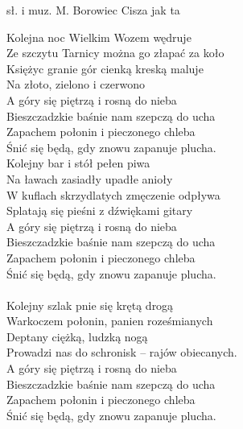 {sł. i muz. M. Borowiec}
{Cisza jak ta}
\begin{text}
Kolejna noc Wielkim Wozem wędruje\\
Ze szczytu Tarnicy można go złapać za koło\\
Księżyc granie gór cienką kreską maluje\\
Na złoto, zielono i czerwono\\

\vin A góry się piętrzą i rosną do nieba\\
\vin Bieszczadzkie baśnie nam szepczą do ucha\\
\vin Zapachem połonin i pieczonego chleba\\
\vin Śnić się będą, gdy znowu zapanuje plucha.\\

Kolejny bar i stół pełen piwa\\
Na ławach zasiadły upadłe anioły\\
W kuflach skrzydlatych zmęczenie odpływa\\
Splatają się pieśni z dźwiękami gitary\\

\vin A góry się piętrzą i rosną do nieba\\
\vin Bieszczadzkie baśnie nam szepczą do ucha\\
\vin Zapachem połonin i pieczonego chleba\\
\vin Śnić się będą, gdy znowu zapanuje plucha.\\
\vin \\

Kolejny szlak pnie się krętą drogą\\
Warkoczem połonin, panien roześmianych\\
Deptany ciężką, ludzką nogą\\
Prowadzi nas do schronisk – rajów obiecanych.\\

\vin A góry się piętrzą i rosną do nieba\\
\vin Bieszczadzkie baśnie nam szepczą do ucha\\
\vin Zapachem połonin i pieczonego chleba\\
\vin Śnić się będą, gdy znowu zapanuje plucha.\\
\end{text}
